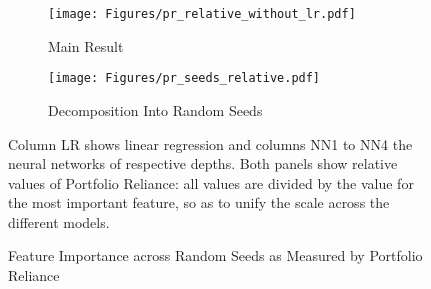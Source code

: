 	\begin{figure}	
		\centering		
		\begin{subfigure}[t]{\textwidth}
			\texttt{[image: Figures/pr\_relative\_without\_lr.pdf]}
			\caption{Main Result}
			\label{fig:pr_seeds_main}
		\end{subfigure}
		
		\begin{subfigure}[t]{\textwidth}
			\centering
			\texttt{[image: Figures/pr\_seeds\_relative.pdf]}
			\caption{Decomposition Into Random Seeds}
			\label{fig:pr_seeds_relative}
		\end{subfigure}
		\caption{Feature Importance across Random Seeds as Measured by Portfolio Reliance}
		\label{fig:pr_seeds}
		\medskip
		\small
		Column LR shows linear regression and columns NN1 to NN4 the neural networks of respective depths. Both panels show relative values of Portfolio Reliance: all values are divided by the value for the most important feature, so as to unify the scale across the different models.
	\end{figure}
	
	